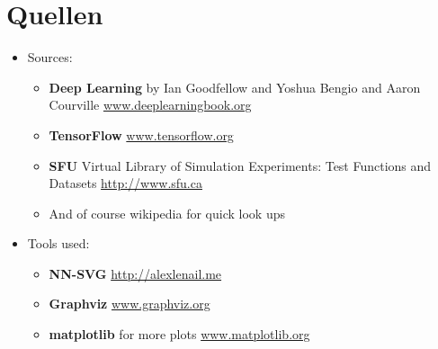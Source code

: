 \documentclass[t]{beamer}
\begin{document}
\section{Quellen}
\begin{frame}
    \begin{itemize}
        \item Sources:
        \begin{itemize}
            \item \textbf{Deep Learning} by Ian Goodfellow and Yoshua Bengio and Aaron Courville \newline
            \href{https://www.deeplearningbook.org}{www.deeplearningbook.org}
            \item \textbf{TensorFlow} \newline
            \href{https://www.tensorflow.org}{www.tensorflow.org}
            \item \textbf{SFU} Virtual Library of Simulation Experiments: Test Functions and Datasets \newline
            \href{http://www.sfu.ca/~ssurjano/camel6.html}{http://www.sfu.ca}
            \item And of course wikipedia for quick look ups \newline
        \end{itemize}
        \item Tools used:
        \begin{itemize}
            \item \textbf{NN-SVG} \newline
            \href{http://alexlenail.me/NN-SVG/index.html}{http://alexlenail.me}
            \item \textbf{Graphviz} \newline
            \href{https://graphviz.org}{www.graphviz.org}
            \item \textbf{matplotlib} for more plots \newline
            \href{https://matplotlib.org}{www.matplotlib.org}
        \end{itemize}
    \end{itemize}
\end{frame}
\end{document}
